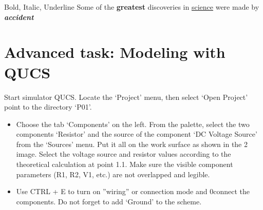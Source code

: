 \documentclass{report}
\begin{document}
Bold, Italic, Underline
Some of the \textbf{greatest}
discoveries in \underline{science} 
were made by \textbf{\textit{accident}}

\section{Advanced task: Modeling with QUCS}
Start simulator QUCS. Locate the ‘Project’ menu, then select ‘Open Project’ point to
the directory ‘P01’.
\begin{itemize}
\item  Choose the tab ‘Components’ on the left. From the palette, select the two components ‘Resistor’ and the source of the component ‘DC Voltage Source’ from the ‘Sources’ menu. Put it all on the work surface as shown in the 2 image. Select the voltage source and resistor values according to the theoretical calculation at point 1.1. Make sure the visible component parameters (R1, R2, V1, etc.) are not overlapped and legible.
\item  Use CTRL + E to turn on ”wiring” or connection mode and 0connect the components. Do not forget to add ‘Ground’ to the scheme.
\end{itemize}
\end{document}
